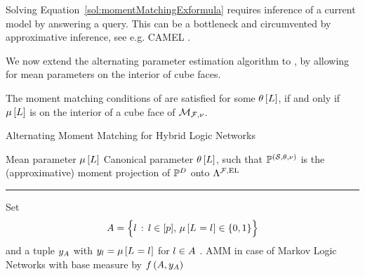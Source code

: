 Solving Equation~\ref{sol:momentMatchingExformula} requires inference of a current model by answering a query.
This can be a bottleneck and circumvented by approximative inference, see e.g. CAMEL \cite{ganapathi_constrained_2008}.

\subsubsect{\HybridLogicNetworks{}}

We now extend the alternating parameter estimation algorithm to \HybridLogicNetworks{}, by allowing for mean parameters on the interior of cube faces.

\begin{lemma}
    The moment matching conditions of  are satisfied for some $\theta\left[L\right]$, if and only if $\mu\left[L\right]$ is on the interior of a cube face of $\mathcal{M}_{\mathcal{F},\nu}$.
\end{lemma}

\begin{algorithm}[hbt!]
    \caption{Alternating Moment Matching for Hybrid Logic Networks}
    \begin{algorithmic}
        \Require Mean parameter $\mu\left[L\right]$ %
        \Ensure Canonical parameter $\theta\left[L\right]$, such that $\mathbb{P}^{(\mathcal{S},\theta,\nu)}$ is the (approximative) moment projection of $\mathbb{P}^{D}$ onto $\Lambda^{\mathcal{F},\mathrm{EL}}$
        \hrule
        \State Set
            \[ A = \Big\{ l \,:\, l\in[p] ,\, \mu\left[L_{}=l_{}\right]\in\{0,1\} \Big\}\]
            and a tuple $y_{A}$ with $y_{l}=\mu\left[L_{}=l_{}\right]$ for $l\in A$ .
        \State \Return AMM in case of Markov Logic Networks with base measure by $f\left(A,y_{A}\right)$
    \end{algorithmic}
\end{algorithm}



